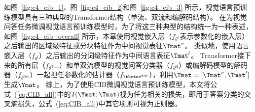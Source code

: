 如图~\ref{fig:c4_cib_1}、图~\ref{fig:c4_cib_2}和图~\ref{fig:c4_cib_3} 所示，视觉语言预训练模型具有三种典型的Transformer结构（单流、双流和编解码结构）。
在为视觉问答任务微调视觉语言预训练模型时，为了将这三种典型的结构统一为一种表述，如图~\ref{fig:c4_cib_overall} 所示，本章使用视觉嵌入层（$f_{\theta^v}$表示参数化的嵌入层）之后输出的区域级特征或分块特征作为中间视觉表征$\Tmat^v$。
类似地，使用语言嵌入层（$f_{\theta^l}$）之后输出的分词级特征作为中间语言表征$\Tmat^l$。
Transformer接下来的所有层（$f_{\theta^{{\text{Tran}}}}$）和单双流模型的视觉问答分类器（$f_{\theta^\text{H}}$）或编解码模型的解码器（$f_{\theta^\text{Dec}}$）一起担任参数化的估计器（$f_{\thetav^\text{ans}}$），利用$\Tmat=[\Tmat^v, \Tmat^l]$生成$\Ymat$。
综上，为了使用CIB微调视觉语言预训练模型，本文将公式~(\ref{eq:CIB_all})中的$I(\Ymat; \Tmat)$视为任务相关的损失，即用于答案分类的交叉熵损失，公式~(\ref{eq:CIB_all})中其它项则可视为正则器。

